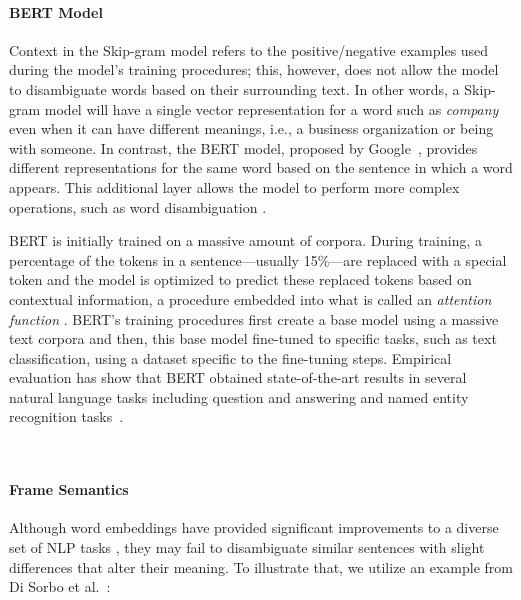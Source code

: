 



\paragraph{\textbf{BERT Model}}
\label{cp5:bert}

Context in the Skip-gram model refers to the positive/negative examples used during the model's training procedures; this, however, does not allow the model to disambiguate words based on their surrounding text. In other words, a Skip-gram model will have a single vector representation for a word such as \textit{company} even when it can have different meanings, i.e., a business organization or being with someone. In contrast, 
the \acf{BERT} model, proposed by Google~\cite{Devlin2018Bert}, provides different representations for the same word based on the sentence in which a word appears.
This additional layer allows the model to perform more complex operations, such as word disambiguation .


BERT is initially trained 
on a massive amount of corpora. During training, a percentage of the tokens in a sentence---usually 15\%---are replaced with a special token and the model is optimized to predict these replaced tokens based on contextual information, a procedure embedded into what is called an \textit{attention function} . 
BERT's training procedures first create a base model using a massive text corpora and then, this base model fine-tuned to specific tasks, such as text classification, using a dataset specific to the fine-tuning steps. 
Empirical evaluation has show that BERT obtained state-of-the-art results in several natural language tasks including  question and answering and named entity recognition tasks~\cite{Devlin2018Bert}. 

~\cite{Lin2021}
~\cite{Araujo2021}




\paragraph{\textbf{Frame Semantics}}
\label{cp5:frame-semantics}


Although word embeddings have provided significant improvements to a diverse set of NLP tasks , they may fail to disambiguate similar sentences with slight differences that alter their meaning. To illustrate that, we utilize an example
from Di Sorbo et al.~\cite{Sorbo2015}:


